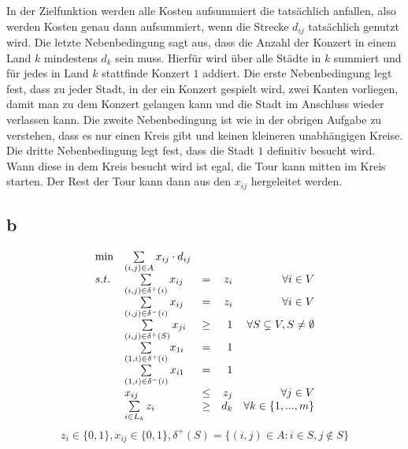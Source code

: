 \documentclass[10pt]{article}
\begin{document}
      In der Zielfunktion werden alle Kosten aufsummiert die tatsächlich
      anfallen, also werden Kosten genau dann aufsummiert, wenn die Strecke
      $d_{ij}$ tatsächlich genutzt wird.
      Die letzte Nebenbedingung sagt aus, dass die Anzahl der Konzert in einem
      Land $k$ mindestens $d_{k}$ sein muss. Hierfür wird über alle Städte in
      $k$ summiert und für jedes in Land $k$ stattfinde Konzert $1$ addiert.
      Die erste Nebenbedingung legt fest, dass zu jeder Stadt, in der ein
      Konzert gespielt wird, zwei Kanten vorliegen, damit man zu dem Konzert
      gelangen kann und die Stadt im Anschluss wieder verlassen kann. Die zweite
      Nebenbedingung ist wie in der obrigen Aufgabe zu verstehen, dass es nur
      einen Kreis gibt und keinen kleineren unabhängigen Kreise. Die dritte
      Nebenbedingung legt fest, dass die Stadt $1$ definitiv besucht wird. Wann
      diese in dem Kreis besucht wird ist egal, die Tour kann mitten im Kreis
      starten. Der Rest der Tour kann dann aus den $x_{ij}$ hergeleitet werden.

    \subsection*{b}
      \begin{displaymath}
        \begin{array}{ l l c r r }
          \min & \sum\limits_{(i,j)\in A} x_{ij}\cdot d_{ij} & & & \\
          s.t. & \sum\limits_{(i,j)\in \delta^{+}(i)} x_{ij} &=& z_{i} & \forall
                i\in V \\
          &\sum\limits_{(i,j)\in\delta^{-}(i)} x_{ij}& = & z_{i} & \forall 
            i\in V\\
            & \sum\limits_{(i,j)\in \delta^{+}(S)} x_{ji} & \geq &  1 & \forall
            S\subsetneq V, S\neq \emptyset \\
            & \sum\limits_{(1,i)\in\delta^{+}(i)} x_{1i} & = & 1 & \\
            &\sum\limits_{(1,i)\in\delta^{-}(i)} x_{i1} &=& 1 & \\
            & x_{ij} & \leq & z_{j} & \forall j\in V \\
            &\sum\limits_{i\in L_{k}} z_{i} & \geq & d_{k} & \forall k\in\{1,...,m\}
        \end{array}
      \end{displaymath}
      \begin{displaymath}
        z_{i}\in\{0,1\},x_{ij}\in\{0,1\}, \delta^{+}(S)=\{(i,j)\in A:i\in S, j\not\in S\}
      \end{displaymath}
\end{document}
